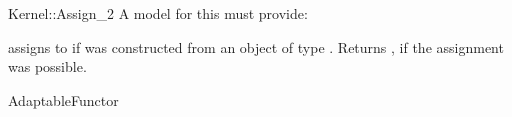 \begin{ccRefFunctionObjectConcept}{Kernel::Assign_2}
A model for this must provide:


{assigns  to  if 
was constructed from an object of type .
Returns , if the assignment was possible.}

\ccRefines
AdaptableFunctor

\ccSeeAlso
{}\\
  \\
 \\
  \\

\end{ccRefFunctionObjectConcept}
